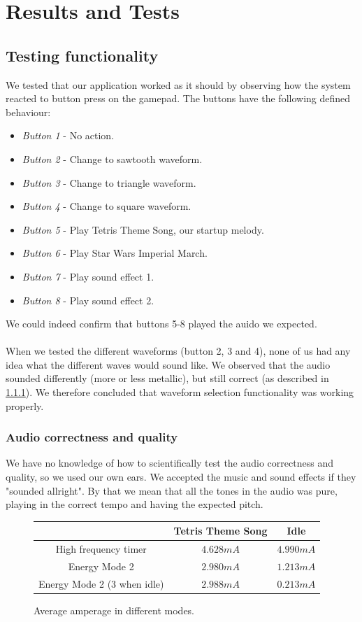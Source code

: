 \section{Results and Tests}

\subsection{Testing functionality}
We tested that our application worked as it should by observing how the system reacted to button press on the gamepad. The buttons have the following defined behaviour:
\begin{itemize}
	\item \emph{Button 1} - No action. 
	\item \emph{Button 2} - Change to sawtooth waveform.
	\item \emph{Button 3} - Change to triangle waveform.
	\item \emph{Button 4} - Change to square waveform.
	\item \emph{Button 5} - Play Tetris Theme Song, our startup melody.
	\item \emph{Button 6} - Play Star Wars Imperial March.
	\item \emph{Button 7} - Play sound effect 1.
	\item \emph{Button 8} - Play sound effect 2.
\end{itemize}

We could indeed confirm that buttons 5-8 played the auido we expected. \\
\\
When we tested the different waveforms (button 2, 3 and 4), none of us had any idea what the different waves would sound like. We observed that the audio sounded differently (more or less metallic), but still correct (as described in \ref{audio_correctness}). We therefore concluded that waveform selection functionality was working properly.

\subsubsection{Audio correctness and quality}
\label{audio_correctness}
We have no knowledge of how to scientifically test the audio correctness and quality, so we used our own ears. We accepted the music and sound effects if they "sounded allright". By that we mean that all the tones in the audio was pure, playing in the correct tempo and having the expected pitch. 

\begin{figure}[h]
	\centering
	\begin{tabular}{c | c  c}
			& Tetris Theme Song & Idle \\
		\hline
		\hline
		High frequency timer & $4.628mA$ & $4.990mA$ \\
		Energy Mode 2 & $2.980mA$ & $1.213mA$ \\
		Energy Mode 2 (3 when idle) & $2.988mA$ & $0.213mA$ \\

	\end{tabular}
	\caption{Average amperage in different modes.}
	\label{fig:energy_results}

\end{figure}

